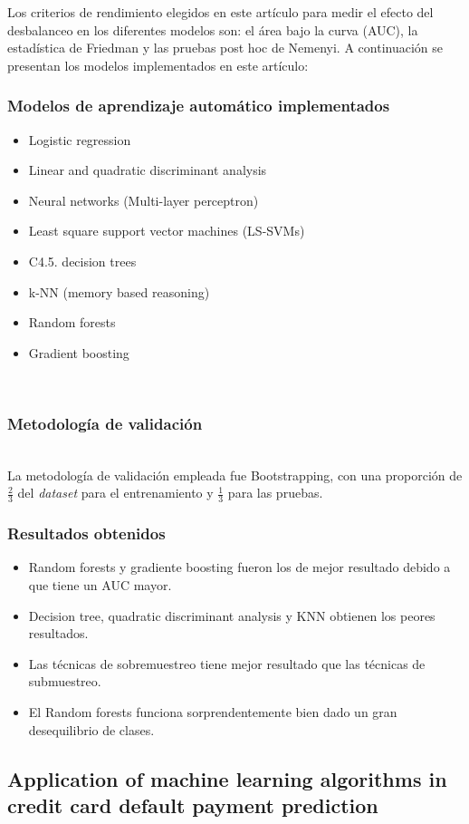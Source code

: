 \documentclass[conference]{IEEEtran}
\begin{document}
Los criterios de rendimiento elegidos en este artículo para medir el efecto del desbalanceo en los diferentes modelos son: el área bajo la curva (AUC), la estadística de Friedman y las pruebas post hoc de Nemenyi.
A continuación se presentan los modelos implementados en este artículo:
\subsubsection{Modelos de aprendizaje automático implementados}
\begin{itemize}
\item Logistic regression
\item Linear and quadratic discriminant analysis
\item Neural networks (Multi-layer perceptron)
\item Least square support vector machines (LS-SVMs)
\item C4.5. decision trees
\item k-NN (memory based reasoning)
\item Random forests
\item Gradient boosting
\end{itemize}
\hfill\\
\subsubsection{Metodología de validación}\hfill\\
La metodología de validación empleada fue Bootstrapping, con una proporción de 
$\frac{2}{3}$ del \textit{dataset} para el entrenamiento y $\frac{1}{3}$ para las pruebas. 
\hfill\\
\subsubsection{Resultados obtenidos}
\begin{itemize}
\item Random forests y gradiente boosting fueron los de mejor resultado debido a que tiene un AUC mayor.
\item Decision tree,  quadratic discriminant analysis y KNN obtienen los peores resultados.
\item Las técnicas de sobremuestreo tiene mejor resultado que las técnicas de submuestreo.
\item El Random forests funciona sorprendentemente bien dado un gran desequilibrio de clases.
\end{itemize}
\subsection{Application of machine learning algorithms in credit card default payment prediction}
\end{document}
